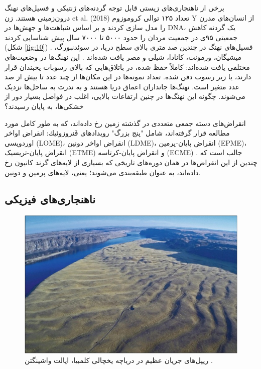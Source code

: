 \documentclass[10pt,twocolumn,letterpaper]{article}
\begin{document}
برخی از ناهنجاری‌های زیستی قابل توجه گردنه‌های ژنتیکی و فسیل‌های نهنگ درون‌زمینی هستند. زن et al. (2018) تعداد ۱۲۵ توالی کروموزوم Y از انسان‌های مدرن را مدل سازی کردند و بر اساس شباهت‌ها و جهش‌ها در DNA، یک گردنه کاهش جمعیتی ۹۵\٪ی در جمعیت مردان را حدود ۵۰۰۰ تا ۷۰۰۰ سال پیش شناسایی کردند (شکل \ref{fig:10}) \cite{62}. فسیل‌های نهنگ در چندین صد متری بالای سطح دریا، در سوئدنبورگ، میشیگان، ورمونت، کانادا، شیلی و مصر یافت شده‌اند \cite{63,64,65,66}. این نهنگ‌ها در وضعیت‌های مختلفی یافت شده‌اند: کاملاً حفظ شده، در باتلاق‌هایی که بالای رسوبات یخبندان قرار دارند، یا زیر رسوب دفن شده. تعداد نمونه‌ها در این مکان‌ها از چند عدد تا بیش از صد عدد متغیر است. نهنگ‌ها جانداران اعماق دریا هستند و به ندرت به ساحل‌ها نزدیک می‌شوند. چگونه این نهنگ‌ها در چنین ارتفاعات بالایی، اغلب در فواصل بسیار دور از خشکی‌ها، به پایان رسیدند؟

انقراض‌های دسته جمعی متعددی در گذشته زمین رخ داده‌اند، که به طور کامل مورد مطالعه قرار گرفته‌اند، شامل "پنج بزرگ" رویدادهای فَنروزوئيك: انقراض اواخر اوردویسی (LOME)، انقراض اواخر دونین (LDME)، انقراض پایان-پرمین (EPME)، انقراض پایان-تریسیک (ETME) و انقراض پایان-کرتاسه (ECME) \cite{88,89}. جالب است که چندین از این انقراض‌ها در همان دوره‌های تاریخی که بسیاری از لایه‌های گرند کانیون رخ داده‌اند، به عنوان طبقه‌بندی می‌شوند؛ یعنی، لایه‌های پرمین و دونین.

\subsection{ناهنجاری‌های فیزیکی}

\begin{figure}[b]
\begin{center}
   \includegraphics[width=1\linewidth]{columbia.jpg}
\end{center}
   \caption{ریپل‌های جریان عظیم در دریاچه یخچالی کلمبیا، ایالت واشینگتن \cite{80}.}
\label{fig:11}
\label{fig:onecol}
\end{figure}
\end{document}
